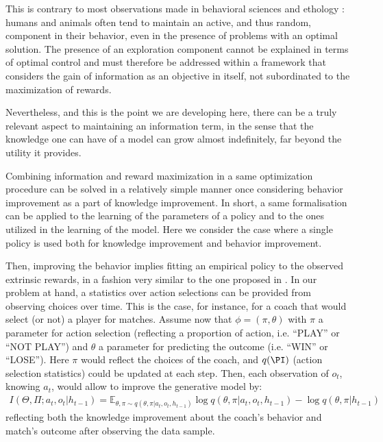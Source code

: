 \documentclass[10pt,letterpaper]{article}
\begin{document}
This is contrary to most observations made in behavioral sciences and ethology \cite{levine2018reinforcement}: humans and animals often tend to maintain an active, and thus random, component in their behavior, even in the presence of problems with an optimal solution. The presence of an exploration component cannot be explained in terms of optimal control and must therefore be addressed within a framework that considers the gain of information as an objective in itself, not subordinated to the maximization of rewards.

{\color{blue} Nevertheless, and this is the point we are developing here, there can be a truly relevant aspect to maintaining an information term, in the sense that the knowledge one can have of a model can grow almost indefinitely, far beyond the utility it provides. }

Combining information and reward maximization in a same optimization procedure can be solved in a relatively simple manner once considering behavior improvement as a part of knowledge improvement. In short, a same formalisation can be applied to the learning of the parameters of a policy and to the ones utilized in the learning of the model. Here we consider the case where  a single policy is used both for knowledge improvement and behavior improvement.

Then, improving the behavior implies fitting an empirical policy to the observed extrinsic rewards, in a fashion very similar to the one proposed in \cite{haarnoja2018soft}.
In our problem at hand, a statistics over action selections can be provided from observing choices over time. This is the case, for instance, for a coach that would select (or not) a player for matches. Assume now that $\phi=(\pi, \theta)$ with $\pi$ a parameter for action selection (reflecting a proportion of action, i.e. ``PLAY'' or ``NOT PLAY'') and $\theta$ a parameter for predicting the outcome (i.e. ``WIN'' or ``LOSE''). Here $\pi$ would reflect the choices of the coach, and $q(\PI)$ (action selection statistics) could be updated at each step. %
Then, each observation of $o_t$, knowing $a_t$, would allow to improve the generative model by: \begin{align}\label{eq:BS-joint}
I(\Theta,\Pi;a_t,o_t|h_{t-1})= \mathbb{E}_{\theta,\pi\sim q(\theta,\pi|a_t,o_t,h_{t-1})}\log q(\theta,\pi|a_t, o_t, h_{t-1}) - \log q(\theta,\pi|h_{t-1}) 
\end{align}
reflecting both the knowledge improvement about the coach's behavior and match's outcome after observing the data sample.
\end{document}
